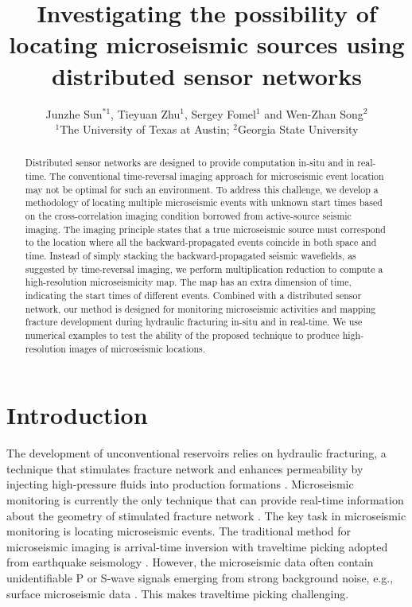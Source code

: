
\title{Investigating the possibility of locating microseismic sources using distributed sensor networks}
\author{Junzhe Sun$^{*1}$, Tieyuan Zhu$^1$, Sergey Fomel$^1$ and Wen-Zhan Song$^{2}$
\\
$^1$The University of Texas at Austin; $^2$Georgia State University}

\maketitle


\begin{abstract}
Distributed sensor networks are designed to provide computation in-situ and in real-time. The conventional time-reversal imaging approach for microseismic event location may not be optimal for such an environment. To address this challenge, we develop a methodology of locating multiple microseismic events with unknown start times based on the cross-correlation imaging condition borrowed from active-source seismic imaging. The imaging principle states that a true microseismic source must correspond to the location where all the backward-propagated events coincide in both space and time. Instead of simply stacking the backward-propagated seismic wavefields, as suggested by time-reversal imaging, we perform multiplication reduction to compute a high-resolution microseismicity map. The map has an extra dimension of time, indicating the start times of different events. Combined with a distributed sensor network, our method is designed for monitoring microseismic activities and mapping fracture development during hydraulic fracturing in-situ and in real-time. We use numerical examples to test the ability of the proposed technique to produce high-resolution images of microseismic locations.
\end{abstract}

\section{Introduction}
The development of unconventional reservoirs relies on hydraulic fracturing, a technique that stimulates fracture network and enhances permeability by injecting high-pressure fluids into production formations \cite[]{montgomery10}. Microseismic monitoring is currently the only technique that can provide real-time information about the geometry of stimulated fracture network \cite[]{maxwellbook}. The key task in microseismic monitoring is locating microseismic events. The traditional method for microseismic imaging is arrival-time inversion with traveltime picking adopted from earthquake seismology \cite[]{gibowicz13}. However, the microseismic data often contain unidentifiable P or S-wave signals emerging from strong background noise, e.g., surface microseismic data \cite[]{duncan10}. This makes traveltime picking challenging.

